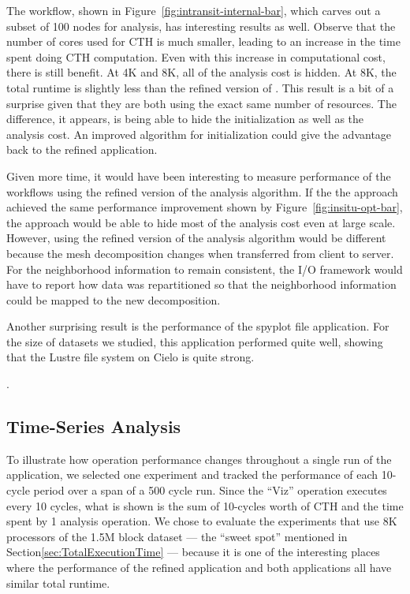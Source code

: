 The \intransit workflow, shown in Figure~\ref{fig:intransit-internal-bar},
which carves out a subset of 100 nodes for analysis, has interesting
results as well.  Observe that the number of cores used for CTH is much
smaller, leading to an increase in the time spent doing CTH computation.
Even with this increase in computational cost, there is still benefit.  At
4K and 8K, all of the analysis cost is hidden.  At 8K, the total runtime is
slightly less than the refined version of \insitu.  This result is a bit
of a surprise given that they are both using the exact same number of
resources.  The difference, it appears, is being able to hide the
initialization as well as the analysis cost.   An
improved algorithm for initialization could give the advantage back to the
refined \insitu application.

Given more time, it would have been interesting to measure
performance of the \intransit workflows using the refined version of
the analysis algorithm.  If the the \intransit approach achieved the same
performance improvement shown by Figure~\ref{fig:insitu-opt-bar}, the
\intransit approach would be able to hide most of the analysis cost even at
large scale.  However, using the refined version of the analysis algorithm
would be different because the mesh decomposition changes when transferred
from client to server.  For the neighborhood information to remain
consistent, the I/O framework would have to report how data was
repartitioned so that the neighborhood information could be mapped to the
new decomposition.

Another surprising result is the performance of the spyplot file application.
For the size of datasets we studied, this application performed quite well, showing that
the Lustre file system on Cielo is quite strong.

.


\subsection{Time-Series Analysis}

To illustrate how operation performance changes throughout a single run
of the application, we selected one experiment and tracked the performance of
each 10-cycle period over a span of a 500 cycle run.  Since the ``Viz''
operation executes every 10 cycles, what is shown is the sum of 10-cycles worth
of CTH and the time spent by 1 analysis operation. We chose to evaluate
the experiments that use 8K processors of the 1.5M block dataset --- the ``sweet
spot'' mentioned in Section\ref{sec:TotalExecutionTime} --- because it is one of
the interesting places where the performance of the refined \insitu application
and both \intransit applications all have similar total runtime.

